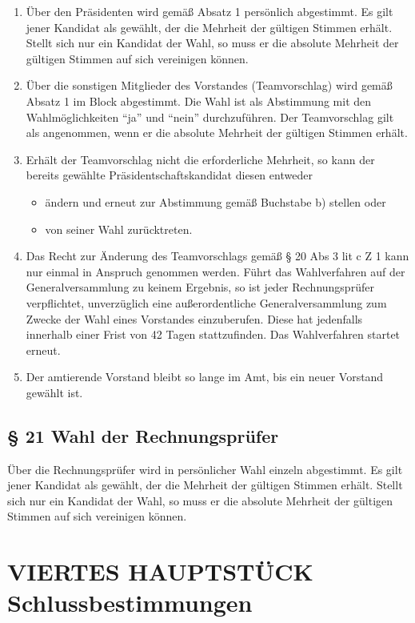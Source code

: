 \documentclass[10pt,a4paper]{article}
\begin{document}
\begin{enumerate}[label=\alph*)]
\item
Über den Präsidenten wird gemäß Absatz 1 persönlich abgestimmt.
Es gilt jener Kandidat als gewählt, der die Mehrheit der gültigen Stimmen erhält.
Stellt sich nur ein Kandidat der Wahl, so muss er die absolute Mehrheit der gültigen Stimmen auf sich vereinigen können.
\item
Über die sonstigen Mitglieder des Vorstandes (Teamvorschlag) wird gemäß Absatz 1 im Block abgestimmt.
Die Wahl ist als Abstimmung mit den Wahlmöglichkeiten "`ja"' und "`nein"' durchzuführen.
Der Teamvorschlag gilt als angenommen, wenn er die absolute Mehrheit der gültigen Stimmen erhält.
\item
Erhält der Teamvorschlag nicht die erforderliche Mehrheit, so kann der bereits gewählte Präsidentschaftskandidat diesen entweder
	\begin{itemize}
	\renewcommand\labelitemi{-}
	\item
	ändern und erneut zur Abstimmung gemäß Buchstabe b) stellen oder
	\item
	von seiner Wahl zurücktreten.
	\end{itemize}
\item
Das Recht zur Änderung des Teamvorschlags gemäß § 20 Abs 3 lit c Z 1 kann nur einmal in Anspruch genommen werden.
Führt das Wahlverfahren auf der Generalversammlung zu keinem Ergebnis, so ist jeder Rechnungsprüfer verpflichtet, unverzüglich eine außerordentliche Generalversammlung zum Zwecke der Wahl eines Vorstandes einzuberufen.
Diese hat jedenfalls innerhalb einer Frist von 42 Tagen stattzufinden.
Das Wahlverfahren startet erneut.
\item
Der amtierende Vorstand bleibt so lange im Amt, bis ein neuer Vorstand gewählt ist.
\end{enumerate}

\subsection{§ 21
Wahl der Rechnungsprüfer}

Über die Rechnungsprüfer wird in persönlicher Wahl einzeln abgestimmt.
Es gilt jener Kandidat als gewählt, der die Mehrheit der gültigen Stimmen erhält.
Stellt sich nur ein Kandidat der Wahl, so muss er die absolute Mehrheit der gültigen Stimmen auf sich vereinigen können.

\section{VIERTES HAUPTSTÜCK\\Schlussbestimmungen}
\end{document}
